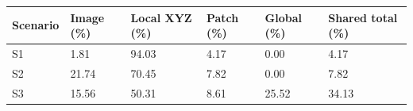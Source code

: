 \begin{tabular}{llllll}
\hline
Scenario & Image (\%) & Local XYZ (\%) & Patch (\%) & Global (\%) & Shared total (\%) \\
\hline
S1 & 1.81 & 94.03 & 4.17 & 0.00 & 4.17 \\
S2 & 21.74 & 70.45 & 7.82 & 0.00 & 7.82 \\
S3 & 15.56 & 50.31 & 8.61 & 25.52 & 34.13 \\
\hline
\end{tabular}
